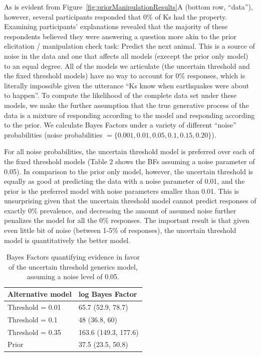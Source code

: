 \documentclass[floatsintext,doc]{apa6}
\theoremstyle{definition}
\theoremstyle{definition}
\theoremstyle{definition}
\theoremstyle{remark}
\begin{document}
As is evident from Figure~\ref{fig:priorManipulationResults}A (bottom
row, \enquote{data}), however, several participants responded that 0\%
of Ks had the property. Examining participants' explanations revealed
that the majority of these respondents believed they were answering a
question more akin to the prior elicitation / manipulation check task:
Predict the next animal. This is a source of noise in the data and one
that affects all models (execept the prior only model) to an equal
degree. All of the models we articulate (the uncertain threshold and the
fixed threshold models) have no way to account for 0\% responses, which
is literally impossible given the utterance \enquote{Ks know when
earthquakes were about to happen}. To compute the likelihood of the
complete data set under these models, we make the further assumption
that the true generative process of the data is a mixture of responding
according to the model and responding according to the prior. We
calculate Bayes Factors under a variety of different \enquote{noise}
probabilities (noise probabilities
\(= \{0.001, 0.01, 0.05, 0.1, 0.15, 0.20\}\)).

For all noise probabilities, the uncertain threshold model is preferred
over each of the fixed threshold models (Table 2 shows the BFs assuming
a noise parameter of 0.05). In comparison to the prior only model,
however, the uncertain threshold is equally as good at predicting the
data with a noise parameter of 0.01, and the prior is the preferred
model with noise parameters smaller than 0.01. This is unsurprising
given that the uncertain threshold model cannot predict responses of
exactly 0\% prevalence, and decreasing the amount of assumed noise
further penalizes the model for all the 0\% responses. The important
result is that given even little bit of noise (between 1-5\% of responses),
the uncertain threshold model is quantitatively the better model.


\begin{table}[h]
\centering
\begingroup\fontsize{9pt}{10pt}\selectfont
\begin{tabular}{ll}
  \hline
Alternative model & log Bayes Factor \\ 
  \hline
Threshold = 0.01 & 65.7 (52.9, 78.7) \\ 
  Threshold = 0.1 & 48 (36.8, 60) \\ 
  Threshold = 0.35 & 163.6 (149.3, 177.6) \\ 
  Prior & 37.5 (23.5, 50.8) \\ 
   \hline
\end{tabular}
\endgroup
\caption{Bayes Factors quantifying evidence in favor of the uncertain threshold generics model, assuming a noise level of 0.05.} 
\end{table}
\end{document}
